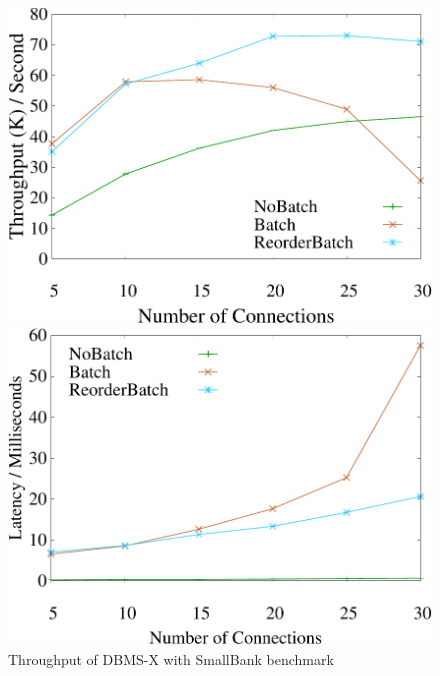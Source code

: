 \begin{figure}[t]
	\centering
	\begin{minipage}[b]{0.31\linewidth}
		\centering
		\includegraphics[width=\textwidth]{./exp_fig/hekaton/hekaton_tps}
		\vspace{-2em}
		\caption{Throughput of DBMS-X with SmallBank benchmark}
		\label{fig:hekaton:tps}
	\end{minipage}
	\begin{minipage}[b]{0.31\linewidth}
	\centering
	\includegraphics[width=\textwidth]{./exp_fig/hekaton/hekaton_latency}

\end{minipage}
\end{figure}
